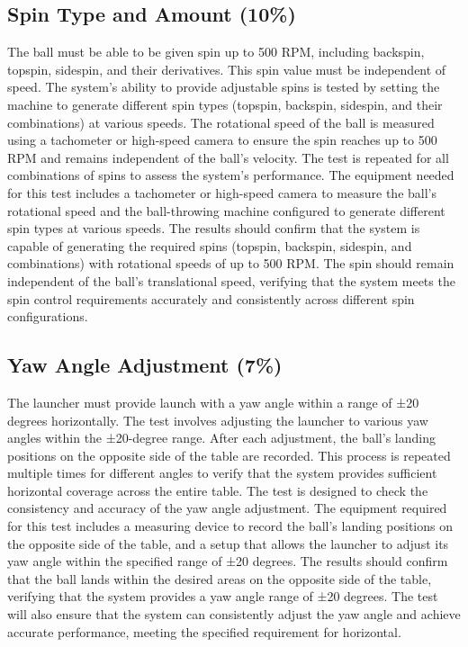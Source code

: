 \documentclass[12pt]{report}
\begin{document}
\subsection{Spin Type and Amount (10\%)}
The ball must be able to be given spin up to 500 RPM, including backspin, topspin, sidespin, and their derivatives. This spin value must be independent of speed. The system’s ability to provide adjustable spins is tested by setting the machine to generate different spin types (topspin, backspin, sidespin, and their combinations) at various speeds. The rotational speed of the ball is measured using a tachometer or high-speed camera to ensure the spin reaches up to 500 RPM and remains independent of the ball’s velocity. The test is repeated for all combinations of spins to assess the system's performance. The equipment needed for this test includes a tachometer or high-speed camera to measure the ball’s rotational speed and the ball-throwing machine configured to generate different spin types at various speeds. The results should confirm that the system is capable of generating the required spins (topspin, backspin, sidespin, and combinations) with rotational speeds of up to 500 RPM. The spin should remain independent of the ball’s translational speed, verifying that the system meets the spin control requirements accurately and consistently across different spin configurations.

\subsection{Yaw Angle Adjustment (7\%)}
The launcher must provide launch with a yaw angle within a range of ±20 degrees horizontally. The test involves adjusting the launcher to various yaw angles within the ±20-degree range. After each adjustment, the ball’s landing positions on the opposite side of the table are recorded. This process is repeated multiple times for different angles to verify that the system provides sufficient horizontal coverage across the entire table. The test is designed to check the consistency and accuracy of the yaw angle adjustment. The equipment required for this test includes a measuring device to record the ball’s landing positions on the opposite side of the table, and a setup that allows the launcher to adjust its yaw angle within the specified range of ±20 degrees. The results should confirm that the ball lands within the desired areas on the opposite side of the table, verifying that the system provides a yaw angle range of ±20 degrees. The test will also ensure that the system can consistently adjust the yaw angle and achieve accurate performance, meeting the specified requirement for horizontal.
\end{document}
